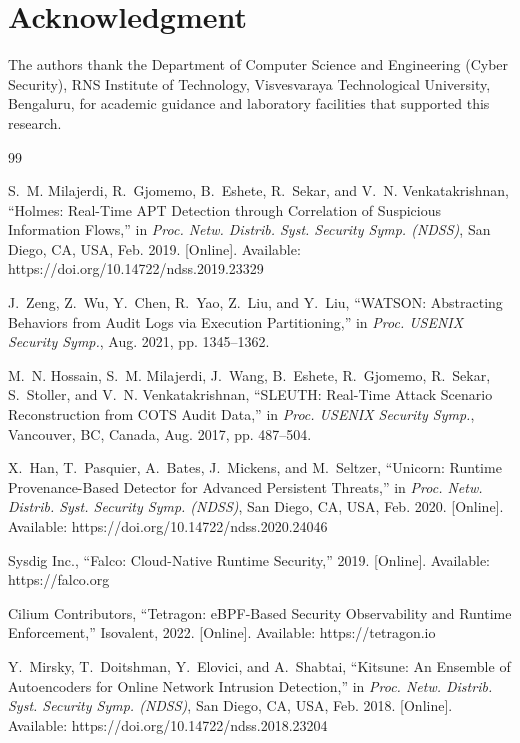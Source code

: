 \documentclass[conference]{IEEEtran}
\begin{document}
\section*{Acknowledgment}
The authors thank the Department of Computer Science and Engineering
(Cyber Security), RNS Institute of Technology, Visvesvaraya Technological
University, Bengaluru, for academic guidance and laboratory facilities
that supported this research.

\begin{thebibliography}{99}

S.~M. Milajerdi, R.~Gjomemo, B.~Eshete, R.~Sekar, and V.~N. Venkatakrishnan,
``Holmes: Real-Time APT Detection through Correlation of Suspicious Information
Flows,'' in \textit{Proc. Netw. Distrib. Syst. Security Symp. (NDSS)}, San Diego,
CA, USA, Feb. 2019. [Online]. Available: https://doi.org/10.14722/ndss.2019.23329

J.~Zeng, Z.~Wu, Y.~Chen, R.~Yao, Z.~Liu, and Y.~Liu, ``WATSON: Abstracting
Behaviors from Audit Logs via Execution Partitioning,'' in \textit{Proc. USENIX
Security Symp.}, Aug. 2021, pp. 1345--1362.

M.~N. Hossain, S.~M. Milajerdi, J.~Wang, B.~Eshete, R.~Gjomemo, R.~Sekar,
S.~Stoller, and V.~N. Venkatakrishnan, ``SLEUTH: Real-Time Attack Scenario
Reconstruction from COTS Audit Data,'' in \textit{Proc. USENIX Security Symp.},
Vancouver, BC, Canada, Aug. 2017, pp. 487--504.

X.~Han, T.~Pasquier, A.~Bates, J.~Mickens, and M.~Seltzer, ``Unicorn: Runtime
Provenance-Based Detector for Advanced Persistent Threats,'' in \textit{Proc.
Netw. Distrib. Syst. Security Symp. (NDSS)}, San Diego, CA, USA, Feb. 2020.
[Online]. Available: https://doi.org/10.14722/ndss.2020.24046

Sysdig Inc., ``Falco: Cloud-Native Runtime Security,'' 2019. [Online].
Available: https://falco.org

Cilium Contributors, ``Tetragon: eBPF-Based Security Observability and
Runtime Enforcement,'' Isovalent, 2022. [Online]. Available:
https://tetragon.io

Y.~Mirsky, T.~Doitshman, Y.~Elovici, and A.~Shabtai, ``Kitsune: An Ensemble
of Autoencoders for Online Network Intrusion Detection,'' in \textit{Proc.
Netw. Distrib. Syst. Security Symp. (NDSS)}, San Diego, CA, USA, Feb. 2018.
[Online]. Available: https://doi.org/10.14722/ndss.2018.23204


\end{thebibliography}
\end{document}
